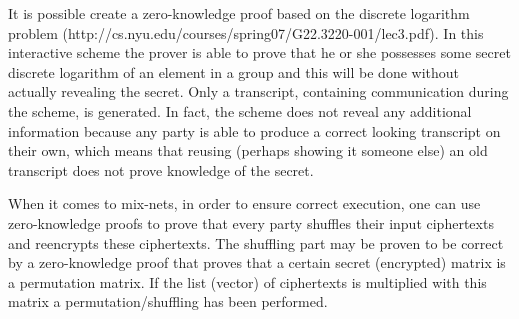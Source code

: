 It is possible create a zero-knowledge proof based on the discrete
logarithm problem
(http://cs.nyu.edu/courses/spring07/G22.3220-001/lec3.pdf). In this
interactive scheme the prover is able to prove that he or she
possesses some secret discrete logarithm of an element in a group and
this will be done without actually revealing the secret. Only a
transcript, containing communication during the scheme, is
generated. In fact, the scheme does not reveal any additional
information because any party is able to produce a correct looking
transcript on their own, which means that reusing (perhaps showing it
someone else) an old transcript does not prove knowledge of the
secret.

When it comes to mix-nets, in order to ensure correct execution, one
can use zero-knowledge proofs to prove that every party shuffles their
input ciphertexts and reencrypts these ciphertexts. The shuffling part
may be proven to be correct by a zero-knowledge proof that proves that
a certain secret (encrypted) matrix is a permutation matrix. If the
list (vector) of ciphertexts is multiplied with this matrix a
permutation/shuffling has been performed.






